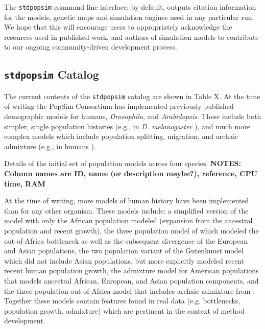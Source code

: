 \documentclass[12pt,halfline,a4paper]{ouparticle}
\newcommand{\stdpopsim}{\texttt{stdpopsim}\xspace}
\begin{document}
The \stdpopsim command line interface, by default, outputs citation information
for the models, genetic maps and simulation engines used in any particular run.
We hope that this will encourage users to appropriately acknowledge the
resources used in published work, and authors
of simulation models to contribute to our ongoing community-driven development process.

\subsection*{\texttt{stdpopsim} Catalog}
The current contents of the \texttt{stdpopsim} catalog are shown in Table X. At the time of
writing the PopSim Consortium has implemented previously published demographic models for
humans, \emph{Drosophila}, and \emph{Arabidopsis}. These include both
simpler, single population histories (e.g., in \emph{D. melanogaster} \cite{sheehan2016deep}),
and much more complex models which include population splitting, migration, and archaic
admixture (e.g., in humans \cite{ragsdale2019models}).

\begin{table}[t]
\begin{footnotesize}

\end{footnotesize}
\caption{\label{tab:catalog}
Details of the initial set of population models across four species.
\textbf{NOTES: Column names are ID, name (or description maybe?),
reference, CPU time, RAM}
}
\end{table}

At the time of writing, more models of human history have been implemented than for
any other organism. These models include: a simplified version of the \cite{tennessen2012evolution}
model with only the African population modeled (expansion from the ancestral
population and recent growth), the three population model of \cite{gutenkunst2009inferring}
which modeled the out-of-Africa bottleneck as well as the subsequent divergence of
the European and Asian populations, the \cite{tennessen2012evolution} two population variant of the
Gutenkunst model which did not include Asian populations, but more explicitly modeled
recent recent human population growth, the \cite{browning2018ancestry} admixture model
for American populations that models ancestral African, European, and Asian population
components, and the three population out-of-Africa model that includes archaic admixture
from \cite{ragsdale2019models}. Together these models
contain features found in real data (e.g. bottlenecks, population growth,
admixture) which are pertinent in the context of method development.
\end{document}
